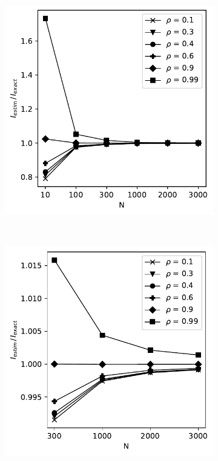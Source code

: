 \documentclass[../Thesis.tex]{subfiles}
\begin{document}
\begin{figure}[H]
    \centering
    \begin{subfigure}[t]{0.49\textwidth}
        \centering
        \includegraphics[width=\linewidth]{figures/ND examples/MI calc/gaussian example all.pdf}
        \caption{}
        \label{subfig:new MI method all}
    \end{subfigure}%
    ~
    \begin{subfigure}[t]{0.49\textwidth}
        \centering
        \includegraphics[width=\linewidth]{figures/ND examples/MI calc/gaussian example zoom.pdf}

\end{subfigure}
\end{figure}
\end{document}
